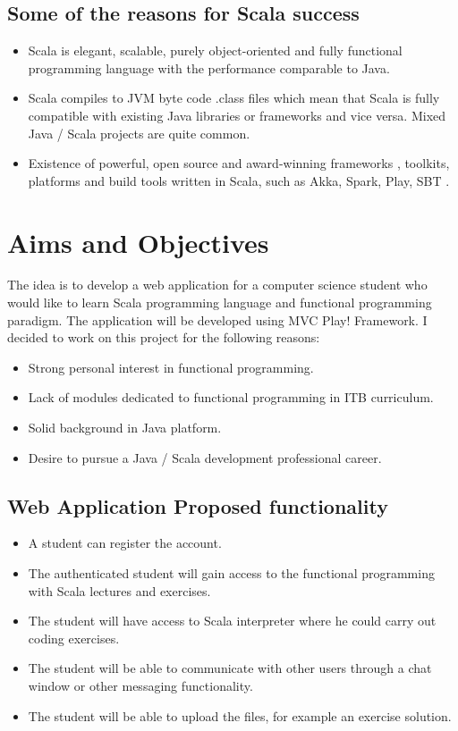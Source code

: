 \documentclass[12pt,twoside,a4paper]{report}
\begin{document}
\subsection{Some of the reasons for Scala success}\label{1.1.1}
\begin{itemize}\itemsep1pt \parskip0pt 
\item Scala is elegant, scalable, purely object-oriented and fully functional programming language with the performance comparable to Java.
\item Scala compiles to JVM byte code .class files which mean that Scala is fully compatible with existing Java libraries or frameworks and vice versa. Mixed Java / Scala projects are quite common.
\item Existence of powerful, open source and award-winning frameworks \cite{6}, toolkits, platforms and build tools written in Scala, such as Akka, Spark, Play, SBT \cite{7}.
\end{itemize}

\section{Aims and Objectives}\label{1.2}
The idea is to develop a web application for a computer science student who would like to learn Scala programming language and functional programming paradigm. The application will be developed using MVC Play! Framework. I decided to work on this project for the following reasons:
\begin{itemize}\itemsep1pt \parskip0pt 
\item Strong personal interest in functional programming.
\item Lack of modules dedicated to functional programming in ITB curriculum.
\item Solid background in Java platform.
\item Desire to pursue a Java / Scala development professional career.
\end{itemize}

\subsection{Web Application Proposed functionality}\label{1.2.1}
\begin{itemize}\itemsep1pt \parskip0pt 
\item A student can register the account.
\item The authenticated student will gain access to the functional programming with Scala lectures and exercises.
\item The student will have access to Scala interpreter where he could carry out coding exercises.
\item The student will be able to communicate with other users through a chat window or other messaging functionality.
\item The student will be able to upload the files, for example an exercise solution.
\end{itemize}
\end{document}
